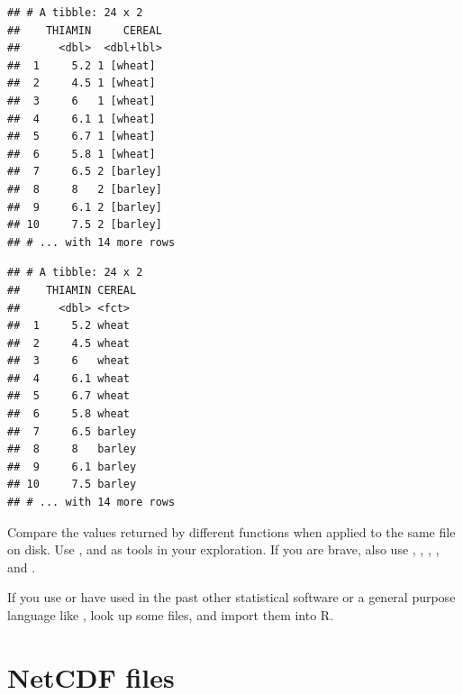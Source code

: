 \documentclass[krantz2]{krantz}\usepackage{knitr}%
\begin{document}
\begin{knitrout}\footnotesize
{}\color{fgcolor}\begin{kframe}
\begin{alltt}
 \hlkwb{<-} \hlstd{(} \hlstd{=} \hlstd{)}
\end{alltt}
\begin{verbatim}
## # A tibble: 24 x 2
##    THIAMIN     CEREAL
##      <dbl>  <dbl+lbl>
##  1     5.2 1 [wheat] 
##  2     4.5 1 [wheat] 
##  3     6   1 [wheat] 
##  4     6.1 1 [wheat] 
##  5     6.7 1 [wheat] 
##  6     5.8 1 [wheat] 
##  7     6.5 2 [barley]
##  8     8   2 [barley]
##  9     6.1 2 [barley]
## 10     7.5 2 [barley]
## # ... with 14 more rows
\end{verbatim}
\begin{alltt}
 \hlkwb{<-} 
\end{alltt}
\begin{verbatim}
## # A tibble: 24 x 2
##    THIAMIN CEREAL
##      <dbl> <fct> 
##  1     5.2 wheat 
##  2     4.5 wheat 
##  3     6   wheat 
##  4     6.1 wheat 
##  5     6.7 wheat 
##  6     5.8 wheat 
##  7     6.5 barley
##  8     8   barley
##  9     6.1 barley
## 10     7.5 barley
## # ... with 14 more rows
\end{verbatim}
\end{kframe}
\end{knitrout}

\begin{playground}
Compare the values returned by different  functions when applied to the same file on disk. Use ,  and  as tools in your exploration. If you are brave, also use , , , ,  and .
\end{playground}

\begin{playground}
If you use or have used in the past other statistical software or a general purpose language like , look up some files, and import them into R.
\end{playground}

\section{NetCDF files}
\end{document}

